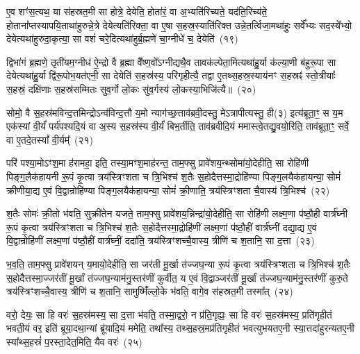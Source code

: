 ए॒व शꣳ॑स॒त्यथ॒ या स॑हस्रत॒मी सा होत्रे॒ देयेति॒ होता॑रं॒ वा अ॒भ्यति॑रिच्यते॒ यद॑ति॒रिच्य॑ते॒ होताना᳚प्तस्यापयि॒ता\-था॑हुरुन्ने॒त्रे देयेत्यति॑रिक्ता॒ वा ए॒षा स॒हस्र॒स्याति॑रिक्त उन्ने॒तर्त्विजा॒मथा॑हुः॒ सर्वे᳚भ्यः सद॒स्ये᳚भ्यो॒ देयेत्यथा॑हुरुदा॒कृत्या॒ सा वशं॑ चरे॒दित्यथा॑हुर्ब्र॒ह्मणे॑ चा॒ग्नीधे॑ च॒ देयेति॑~(१९)

द्विभा॑गं ब्र॒ह्मणे॒ तृती॑यम॒ग्नीध॑ ऐ॒न्द्रो वै ब्र॒ह्मा वै᳚ष्ण॒वो᳚\-ऽग्नीद्यथै॒व तावक॑ल्पेता॒मित्यथा॑हु॒र्या क॑ल्या॒णी ब॑हुरू॒पा सा देयेत्यथा॑हु॒र्या द्वि॑रू॒पोभ॒यत॑एनी॒ सा देयेति॑ स॒हस्र॑स्य॒ परि॑गृहीत्यै॒ तद्वा ए॒तथ्स॒हस्र॒स्याय॑नꣳ स॒हस्रꣴ॑ स्तो॒त्रीयाः᳚ स॒हस्रं॒ दक्षि॑णाः स॒हस्र॑सम्मितः सुव॒र्गो लो॒कः सु॑व॒र्गस्य॑ लो॒कस्या॒भिजि॑त्यै॥~(२०)

{\anuvakamend[{अ॒ब्र॒वी॒च्च॒ तद॒न्तरि॑क्षन्ददात्यच्छावा॒कश्च॒ देयेति॑ स॒प्तच॑त्वारिꣳशच्च}]}%

सोमो॒ वै स॒हस्र॑मविन्द॒त्तमिन्द्रो\-ऽन्व॑विन्द॒त्तौ य॒मो न्याग॑च्छ॒त्ताव॑ब्रवी॒दस्तु॒ मे\-ऽत्रापीत्यस्तु॒ ही(३) इत्य॑ब्रूता॒ꣳ॒ स य॒म एक॑स्यां वी॒र्यं॑ पर्य॑पश्यदि॒यं वा अ॒स्य स॒हस्र॑स्य वी॒र्यं॑ बिभ॒र्तीति॒ ताव॑ब्रवीदि॒यं ममास्त्वे॒तद्यु॒वयो॒रिति॒ ताव॑ब्रूता॒ꣳ॒ सर्वे॒ वा ए॒तदे॒तस्यां᳚ वी॒र्यम्᳚~(२१)

परि॑ पश्या॒मो\-ऽꣳश॒मा ह॑रामहा॒ इति॒ तस्या॒मꣳश॒माह॑रन्त॒ ताम॒फ्सु प्रावे॑शय॒न्थ्सोमा॑यो॒देहीति॒ सा रोहि॑णी पिङ्ग॒लैक॑हायनी रू॒पं कृ॒त्वा त्रय॑स्त्रिꣳशता च त्रि॒भिश्च॑ श॒तैः स॒होदैत्तस्मा॒द्रोहि॑ण्या पिङ्ग॒लयैक॑हायन्या॒ सोमं॑ क्रीणीया॒द्य ए॒वं वि॒द्वान्रोहि॑ण्या पिङ्ग॒लयैक॑हायन्या॒ सोमं॑ क्री॒णाति॒ त्रय॑स्त्रिꣳशता चै॒वास्य॑ त्रि॒भिश्च॑~(२२)

श॒तैः सोमः॑ क्री॒तो भ॑वति॒ सुक्री॑तेन यजते॒ ताम॒फ्सु प्रावे॑शय॒न्निन्द्रा॑यो॒देहीति॒ सा रोहि॑णी लक्ष्म॒णा प॑ष्ठौ॒ही वार्त्र॑घ्नी रू॒पं कृ॒त्वा त्रय॑स्त्रिꣳशता च त्रि॒भिश्च॑ श॒तैः स॒होदैत्तस्मा॒द्रोहि॑णीं लक्ष्म॒णां प॑ष्ठौ॒हीं वार्त्र॑घ्नीं दद्या॒द्य ए॒वं वि॒द्वान्रोहि॑णीं लक्ष्म॒णां प॑ष्ठौ॒हीं वार्त्र॑घ्नीं॒ ददा॑ति॒ त्रय॑स्त्रिꣳशच्चै॒वास्य॒ त्रीणि॑ च श॒तानि॒ सा द॒त्ता~(२३)

भ॒व॒ति॒ ताम॒फ्सु प्रावे॑शयन् य॒मायो॒देहीति॒ सा जर॑ती मू॒र्खा त॑ज्जघ॒न्या रू॒पं कृ॒त्वा त्रय॑स्त्रिꣳशता च त्रि॒भिश्च॑ श॒तैः स॒होदैत्तस्मा॒ज्जर॑तीं मू॒र्खां त॑ज्जघ॒न्याम॑नु॒स्तर॑णीं कुर्वीत॒ य ए॒वं वि॒द्वाञ्जर॑तीं मू॒र्खां त॑ज्जघ॒न्याम॑नु॒स्तर॑णीं कुरु॒ते त्रय॑स्त्रिꣳशच्चै॒वास्य॒ त्रीणि॑ च श॒तानि॒ सामुष्मिँ॑ल्लो॒के भ॑वति॒ वागे॒व स॑हस्रत॒मी तस्मा᳚त्~(२४)

वरो॒ देयः॒ सा हि वरः॑ स॒हस्र॑मस्य॒ सा द॒त्ता भ॑वति॒ तस्मा॒द्वरो॒ न प्र॑ति॒गृह्यः॒ सा हि वरः॑ स॒हस्र॑मस्य॒ प्रति॑गृहीतं भवती॒यं वर॒ इति॑ ब्रूया॒दथा॒न्यां ब्रू॑यादि॒यं ममेति॒ तथा᳚स्य॒ तथ्स॒हस्र॒मप्र॑तिगृहीतं भवत्युभयतए॒नी स्या॒त्तदा॑हुरन्यत\-ए॒नी स्या᳚थ्स॒हस्रं॑ प॒रस्ता॒देत॒मिति॒ यैव वरः॑~(२५)

